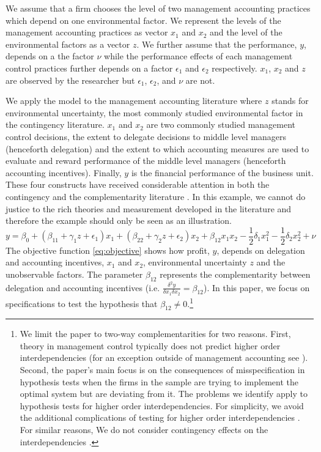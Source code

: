 \documentclass[12pt]{article}
\begin{document}
We assume that a firm chooses the level of two management accounting practices which depend on one environmental factor. We represent the levels of the management accounting practices as vector $x_1$ and $x_2$ and the level of the environmental factors as a vector $z$. We further assume that the performance, $y$, depends on a the factor $\nu$ while the performance effects of each management control practices further depends on a factor $\epsilon_1$ and $\epsilon_2$ respectively. $x_1$, $x_2$ and $z$ are observed by the researcher but $\epsilon_1$, $\epsilon_2$, and $\nu$ are not. 

We apply the model to the management accounting literature where $z$ stands for environmental uncertainty, the most commonly studied environmental factor in the contingency literature. $x_1$ and $x_2$ are two commonly studied management control decisions, the extent to delegate decisions to middle level managers (henceforth delegation) and the extent to which accounting measures are used to evaluate and reward performance of the middle level managers (henceforth accounting incentives). Finally, $y$ is the financial performance of the business unit. These four constructs have received considerable attention in both the contingency and the complementarity literature \citep{Grabner2013,Chenhall2003, otley_contingency_2016}. In this example, we cannot do justice to the rich theories and measurement developed in the literature and therefore the example should only be seen as an illustration.
\begin{equation}\label{eq:objective}
y  = \beta_0 + (\beta_{11} + \gamma_1 z + \epsilon_1) x_1 
						+ (\beta_{22} + \gamma_2 z  + \epsilon_2) x_2 
                        + \beta_{12} x_1 x_2 - \frac{1}{2}\delta_1 x^2_1 - \frac{1}{2}\delta_2 x^2_2 + \nu
\end{equation}
The objective function \eqref{eq:objective} shows how profit, $y$, depends on delegation and accounting incentives, $x_1$ and $x_2$, environmental uncertainty $z$ and the unobservable factors. The parameter $\beta_{12}$ represents the complementarity between delegation and accounting incentives (i.e. $\frac{\delta^2 y}{\delta x_1 \delta x_2} = \beta_{12}$). In this paper, we focus on specifications to test the hypothesis that $\beta_{12} \neq 0$.\footnote{We limit the paper to two-way complementarities for two reasons. First, theory in management control typically does not predict higher order interdependencies (for an exception outside of management accounting see \citet{Aral2012}). Second, the paper's main focus is on the consequences of misspecification in hypothesis tests when the firms in the sample are trying to implement the optimal system but are deviating from it. The problems we identify apply to hypothesis tests for higher order interdependencies. For simplicity, we avoid the additional complications of testing for higher order interdependencies \citep{Carree2011}. For similar reasons, We do not consider contingency effects on the interdependencies \citep{Grabner2016,Matejka2017BalancingEvidence}.}
\end{document}
